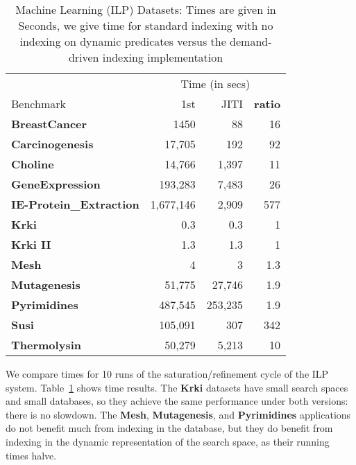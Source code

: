 \documentclass{llncs}
\newcommand{\JITI}{demand-driven indexing\xspace}
\newcommand{\bench}[1]{\textbf{\textsf{#1}}}
\newcommand{\BreastCancer}{\bench{BreastCancer}\xspace}
\newcommand{\Carcinogenesis}{\bench{Carcinogenesis}\xspace}
\newcommand{\Choline}{\bench{Choline}\xspace}
\newcommand{\GeneExpression}{\bench{GeneExpression}\xspace}
\newcommand{\IEProtein}{\bench{IE-Protein\_Extraction}\xspace}
\newcommand{\Krki}{\bench{Krki}\xspace}
\newcommand{\Mesh}{\bench{Mesh}\xspace}
\newcommand{\Mutagenesis}{\bench{Mutagenesis}\xspace}
\newcommand{\Pyrimidines}{\bench{Pyrimidines}\xspace}
\newcommand{\Susi}{\bench{Susi}\xspace}
\newcommand{\Thermolysin}{\bench{Thermolysin}\xspace}
\begin{document}
\begin{table}[t]
  \centering
  \caption{Machine Learning (ILP) Datasets: Times are given in Seconds,
    we give time for standard indexing with no indexing on dynamic
    predicates versus the \JITI implementation}
  \label{tab:ilp:time}
  \setlength{\tabcolsep}{3pt}
  \begin{tabular}{|l||r|r|r|} \hline %
                    & \multicolumn{3}{|c|}{Time (in secs)} \\
    \cline{2-4}
    Benchmark       &    1st    &   JITI  &{\bf ratio} \\
    \hline
    \BreastCancer   &      1450 &      88 &  16    \\
    \Carcinogenesis &    17,705 &     192 &  92    \\
    \Choline        &    14,766 &   1,397 &  11    \\
    \GeneExpression &   193,283 &   7,483 &  26    \\
    \IEProtein      & 1,677,146 &   2,909 & 577    \\
    \bench{Krki}                   &       0.3 &     0.3 &   1    \\
    \bench{Krki II}                &       1.3 &     1.3 &   1    \\
    \Mesh           &         4 &       3 &   1.3  \\
    \bench{Mutagenesis}            &    51,775 &  27,746 &   1.9  \\
    \Pyrimidines    &   487,545 & 253,235 &   1.9  \\
    \Susi           &   105,091 &     307 & 342    \\
    \Thermolysin    &    50,279 &   5,213 &  10    \\
    \hline
\end{tabular}
\end{table}

We compare times for 10 runs of the saturation/refinement cycle of the
ILP system. Table~\ref{tab:ilp:time} shows time results. The
\Krki datasets have small search spaces and small databases, so
they achieve the same performance under both versions:
there is no slowdown. The \Mesh, \Mutagenesis, and
\Pyrimidines applications do not benefit much from indexing in
the database, but they do benefit from indexing in the dynamic
representation of the search space, as their running times halve.
\end{document}
